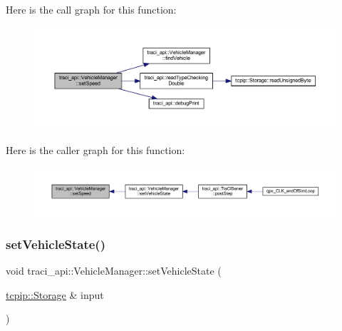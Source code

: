 Here is the call graph for this function\+:
\nopagebreak
\begin{figure}[H]
\begin{center}
\leavevmode
\includegraphics[width=350pt]{classtraci__api_1_1_vehicle_manager_a40adaaa7aaaae5708855c6c4715204fe_cgraph}
\end{center}
\end{figure}
Here is the caller graph for this function\+:
\nopagebreak
\begin{figure}[H]
\begin{center}
\leavevmode
\includegraphics[width=350pt]{classtraci__api_1_1_vehicle_manager_a40adaaa7aaaae5708855c6c4715204fe_icgraph}
\end{center}
\end{figure}
\mbox{\label{classtraci__api_1_1_vehicle_manager_a7b3c7300d7b091527ed296652701c471}} 
\subsubsection{\texorpdfstring{set\+Vehicle\+State()}{setVehicleState()}}
{\footnotesize\ttfamily void traci\+\_\+api\+::\+Vehicle\+Manager\+::set\+Vehicle\+State (\begin{DoxyParamCaption}\item[{\hyperlink{classtcpip_1_1_storage}{tcpip\+::\+Storage} \&}]{input }\end{DoxyParamCaption})}

